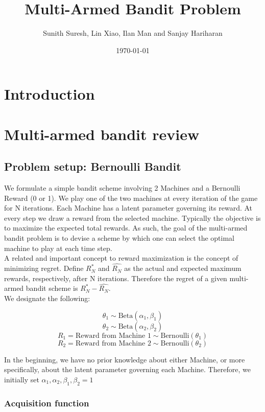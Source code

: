\documentclass{article}
\title{Multi-Armed Bandit Problem}
\author{Sunith Suresh, Lin Xiao, Ilan Man and Sanjay Hariharan}
\date{\today}
\begin{document}
\maketitle

\section{Introduction}

\section{Multi-armed bandit review}



\subsection{Problem setup: Bernoulli Bandit}

We formulate a simple bandit scheme involving 2 Machines and a Bernoulli Reward (0 or 1). We play one of the two machines at every iteration of the game for N iterations. Each Machine has a latent parameter governing its reward. At every step we draw a reward from the selected machine. Typically the objective is to maximize the expected total rewards. As such, the goal of the multi-armed bandit problem is to devise a scheme by which one can select the optimal machine to play at each time step.\\

A related and important concept to reward maximization is the concept of minimizing regret. Define $R_{N}^{*}$ and $\hat{R_{N}}$ as the actual and expected maximum rewards, respectively, after N iterations. Therefore the regret of a given multi-armed bandit scheme is $R_{N}^{*} - \hat{R_{N}}$.\\

We designate the following:

$$\theta_1 \sim \text{Beta}(\alpha_1, \beta_1)$$
$$\theta_2 \sim \text{Beta}(\alpha_2, \beta_2)$$
$$R_1 = \text{Reward from Machine 1} \sim \text{Bernoulli}(\theta_1)$$
$$R_2 = \text{Reward from Machine 2} \sim \text{Bernoulli}(\theta_2)$$


In the beginning, we have no prior knowledge about either Machine, or more specifically, about the latent parameter governing each Machine. Therefore, we initially set $\alpha_1, \alpha_2, \beta_1, \beta_2 = 1$

\subsubsection{Acquisition function}
\end{document}
